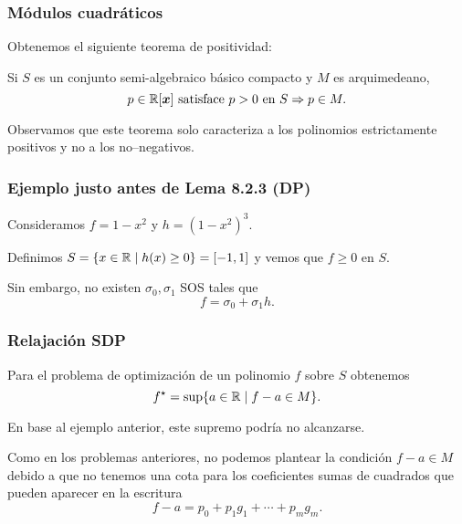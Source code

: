 \documentclass[aspectratio=169,12pt,spanish]{beamer}
\begin{document}

\begin{frame}

\frametitle{Módulos cuadráticos}
Obtenemos el siguiente teorema de positividad:

\begin{theorem}
Si $S$ es un conjunto semi-algebraico básico compacto y $M$ es arquimedeano,
$$p \in \mathbb{R}[\bm{x}] \text{ satisface  } p > 0 \text{ en } S \Rightarrow p \in M.$$
\end{theorem}

Observamos que este teorema solo caracteriza a los polinomios estrictamente positivos y no a los no--negativos.

\end{frame}


\begin{frame}

\frametitle{Ejemplo justo antes de Lema 8.2.3 (DP)}

Consideramos $f = 1 - x^2$ y $h = (1-x^2)^3$.

Definimos $S = \{ x \in \mathbb{R} \mid h(x) \ge 0\} = [-1, 1]$ y vemos que $f \ge 0$ en $S$.

Sin embargo, no existen $\sigma_0, \sigma_1$ SOS tales que
$$
f = \sigma_0 + \sigma_1 h.
$$

\end{frame}


\begin{frame}

\frametitle{Relajación SDP}
Para el problema de optimización de un polinomio $f$ sobre $S$ obtenemos
$$
f^{\star} = \sup\{a \in \mathbb{R} \mid f - a \in M\}.
$$

En base al ejemplo anterior, este supremo podría no alcanzarse.

Como en los problemas anteriores, no podemos plantear la condición $f - a \in M$ debido a que no tenemos una cota para los coeficientes sumas de cuadrados que pueden aparecer en la escritura
$$
f - a = p_0 + p_1 g_1 + \cdots + p_m g_m.
$$

\end{frame}

\end{document}
